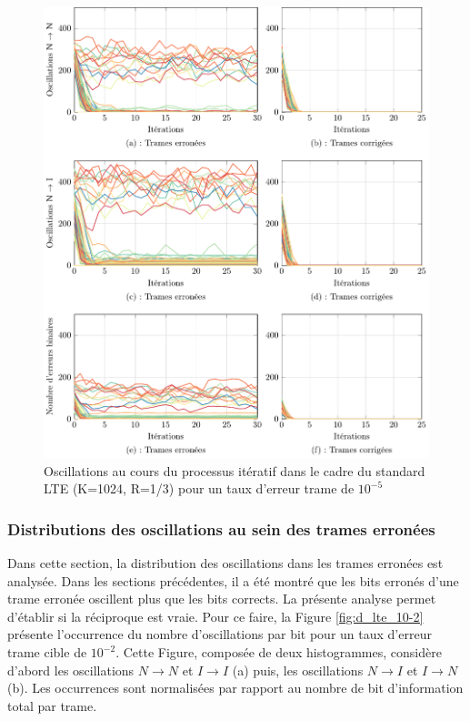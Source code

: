 \begin{figure}[!t]
	\hspace*{-.7cm}
	\begin{center}
	\includegraphics[width=.9\textwidth]{main/ch2_fig/tikz/it_lte10-5.pdf}
	\caption{Oscillations au cours du processus itératif dans le cadre du standard LTE (K=1024, R=1/3) pour un taux d'erreur trame de $10^{-5}$ 
	\label{ch2:fig:it_lte_2}}
	\end{center}
\end{figure}

\subsubsection{Distributions des oscillations au sein des trames erronées} 
Dans cette section, la distribution des oscillations dans les trames erronées est analysée. Dans les sections précédentes,
il a été montré que les bits erronés d'une trame erronée oscillent plus que les bits corrects. La présente analyse permet
d'établir si la réciproque est vraie. Pour ce faire, la Figure \ref{fig:d_lte_10-2} présente l’occurrence du nombre d'oscillations par bit pour un taux 
d'erreur trame cible de $10^{-2}$. Cette Figure, composée de deux histogrammes, considère d'abord les oscillations $N\rightarrow N$ et 
$I\rightarrow I$ (a) puis, les oscillations $N\rightarrow I$ et $I\rightarrow N$ (b). Les occurrences sont normalisées 
par rapport au nombre de bit d'information total par trame.

